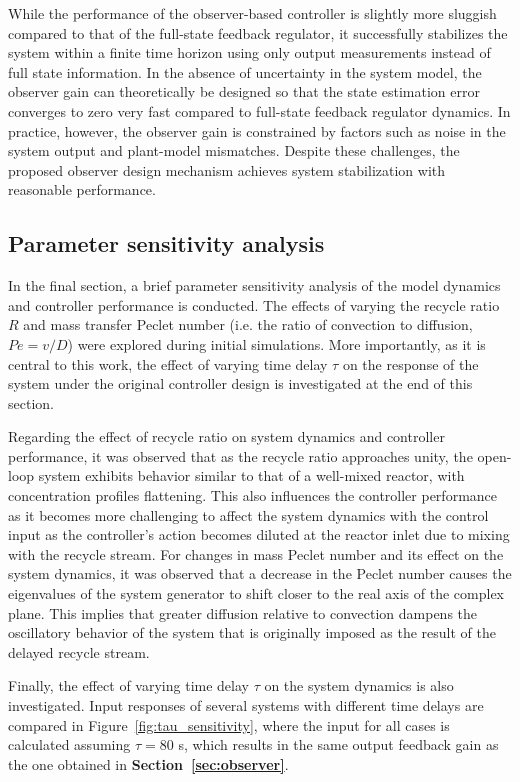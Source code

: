 While the performance of the observer-based controller is slightly more sluggish compared to that of the full-state feedback regulator, it successfully stabilizes the system within a finite time horizon using only output measurements instead of full state information. In the absence of uncertainty in the system model, the observer gain can theoretically be designed so that the state estimation error converges to zero very fast compared to full-state feedback regulator dynamics. In practice, however, the observer gain is constrained by factors such as noise in the system output and plant-model mismatches. Despite these challenges, the proposed observer design mechanism achieves system stabilization with reasonable performance.

\subsection{Parameter sensitivity analysis}

In the final section, a brief parameter sensitivity analysis of the model dynamics and controller performance is conducted. The effects of varying the recycle ratio $R$ and mass transfer Peclet number (i.e. the ratio of convection to diffusion, $Pe = v/D$) were explored during initial simulations. More importantly, as it is central to this work, the effect of varying time delay $\tau$ on the response of the system under the original controller design is investigated at the end of this section.

Regarding the effect of recycle ratio on system dynamics and controller performance, it was observed that as the recycle ratio approaches unity, the open-loop system exhibits behavior similar to that of a well-mixed reactor, with concentration profiles flattening. This also influences the controller performance as it becomes more challenging to affect the system dynamics with the control input as the controller's action becomes diluted at the reactor inlet due to mixing with the recycle stream. For changes in mass Peclet number and its effect on the system dynamics, it was observed that a decrease in the Peclet number causes the eigenvalues of the system generator to shift closer to the real axis of the complex plane. This implies that greater diffusion relative to convection dampens the oscillatory behavior of the system that is originally imposed as the result of the delayed recycle stream.

Finally, the effect of varying time delay $\tau$ on the system dynamics is also investigated. Input responses of several systems with different time delays are compared in Figure~\ref{fig:tau_sensitivity}, where the input for all cases is calculated assuming $\tau = 80$ s, which results in the same output feedback gain as the one obtained in \textbf{Section~\ref{sec:observer}}.

